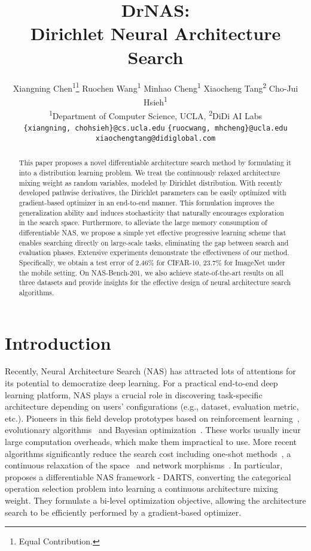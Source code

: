 \documentclass{article} \usepackage{iclr2021_conference,times}
\title{DrNAS: \\
Dirichlet Neural Architecture Search}
\author{
Xiangning Chen\textsuperscript{1}\thanks{Equal Contribution.}
\enskip Ruochen Wang\textsuperscript{1}\textsuperscript{}
\enskip Minhao Cheng\textsuperscript{1}\textsuperscript{}
\enskip Xiaocheng Tang\textsuperscript{2}
\enskip Cho-Jui Hsieh\textsuperscript{1}\\
\textsuperscript{1}Department of Computer Science, UCLA, \enskip \textsuperscript{2}DiDi AI Labs\\
\small{\texttt{\{xiangning, chohsieh\}@cs.ucla.edu}} \quad \small{\texttt{\{ruocwang, mhcheng\}@ucla.edu}}\\
\small{\texttt{xiaochengtang@didiglobal.com}}
}
\begin{document}
\maketitle

\begin{abstract}
This paper proposes a novel differentiable architecture search method by formulating it into a distribution learning problem. We treat the continuously relaxed architecture mixing weight as random variables, modeled by Dirichlet distribution. With recently developed pathwise derivatives, the Dirichlet parameters can be easily optimized with gradient-based optimizer in an end-to-end manner. This formulation improves the generalization ability and induces stochasticity that naturally encourages exploration in the search space. Furthermore, to alleviate the large memory consumption of differentiable NAS, we propose a simple yet effective progressive learning scheme that enables searching directly on large-scale tasks, eliminating the gap between search and evaluation phases. Extensive experiments demonstrate the effectiveness of our method. Specifically, we obtain a test error of 2.46\% for CIFAR-10, 23.7\% for ImageNet under the mobile setting. On NAS-Bench-201, we also achieve state-of-the-art results on all three datasets and provide insights for the effective design of neural architecture search algorithms.
\end{abstract}



\section{Introduction}
Recently, Neural Architecture Search (NAS) has attracted lots of attentions for its potential to democratize deep learning. For a practical end-to-end deep learning platform, NAS plays a crucial role in discovering task-specific architecture depending on users' configurations (e.g., dataset, evaluation metric, etc.).
Pioneers in this field develop prototypes based on reinforcement learning~\citep{nas}, evolutionary algorithms~\citep{amoebanet} and Bayesian optimization~\citep{pnas}. These works usually incur large computation overheads, which make them impractical to use.
More recent algorithms significantly reduce the search cost including one-shot methods~\citep{enas, oneshot}, a continuous relaxation of the space~\citep{darts} and network morphisms~\citep{morphisms}. 
In particular,~\citet{darts} proposes a differentiable NAS framework - DARTS, converting the categorical operation selection problem into learning a continuous architecture mixing weight. They formulate a bi-level optimization objective, allowing the architecture search to be efficiently performed by a gradient-based optimizer.
\end{document}
